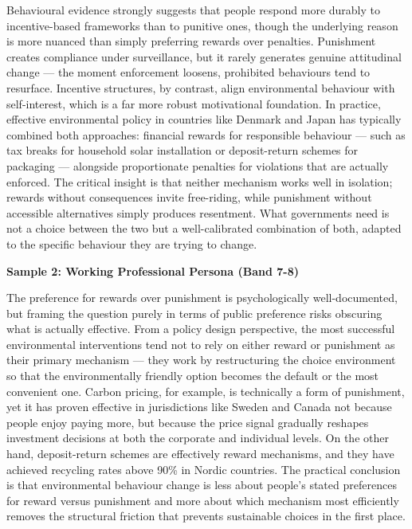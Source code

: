 Behavioural evidence strongly suggests that people respond more durably to incentive-based frameworks than to punitive ones, though the underlying reason is more nuanced than simply preferring rewards over penalties. Punishment creates compliance under surveillance, but it rarely generates genuine attitudinal change — the moment enforcement loosens, prohibited behaviours tend to resurface. Incentive structures, by contrast, align environmental behaviour with self-interest, which is a far more robust motivational foundation. In practice, effective environmental policy in countries like Denmark and Japan has typically combined both approaches: financial rewards for responsible behaviour — such as tax breaks for household solar installation or deposit-return schemes for packaging — alongside proportionate penalties for violations that are actually enforced. The critical insight is that neither mechanism works well in isolation; rewards without consequences invite free-riding, while punishment without accessible alternatives simply produces resentment. What governments need is not a choice between the two but a well-calibrated combination of both, adapted to the specific behaviour they are trying to change.

\textbf{Sample 2: Working Professional Persona (Band 7-8)}

The preference for rewards over punishment is psychologically well-documented, but framing the question purely in terms of public preference risks obscuring what is actually effective. From a policy design perspective, the most successful environmental interventions tend not to rely on either reward or punishment as their primary mechanism — they work by restructuring the choice environment so that the environmentally friendly option becomes the default or the most convenient one. Carbon pricing, for example, is technically a form of punishment, yet it has proven effective in jurisdictions like Sweden and Canada not because people enjoy paying more, but because the price signal gradually reshapes investment decisions at both the corporate and individual levels. On the other hand, deposit-return schemes are effectively reward mechanisms, and they have achieved recycling rates above 90\% in Nordic countries. The practical conclusion is that environmental behaviour change is less about people's stated preferences for reward versus punishment and more about which mechanism most efficiently removes the structural friction that prevents sustainable choices in the first place.

\separator

